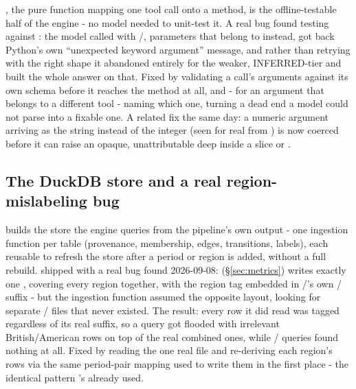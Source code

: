 \documentclass[11pt]{article}
\begin{document}
, the pure function mapping one tool call onto a
 method, is the offline-testable half of the engine - no
model needed to unit-test it. A real bug found testing
 against : the model called
 with /,
parameters that belong to  instead, got
back Python's own ``unexpected keyword argument'' message, and rather
than retrying with the right shape it abandoned
 entirely for the weaker, INFERRED-tier
 and built the whole answer on that. Fixed by
validating a call's arguments against its own schema before it reaches
the method at all, and - for an argument that belongs to a different
tool - naming which one, turning a dead end a model could not parse
into a fixable one. A related fix the same day: a numeric argument
arriving as the string  instead of the integer 
(seen for real from ) is now coerced before it can
raise an opaque, unattributable  deep inside a
slice or .

\subsection{The DuckDB store and a real region-mislabeling bug}

 builds the store the engine queries from
the pipeline's own output - one ingestion function per table
(provenance, membership, edges, transitions, labels), each reusable to
refresh the store after a period or region is added, without a full
rebuild.  shipped with a real bug found
2026-09-08:  (\S\ref{sec:metrics}) writes exactly one
, covering every region together, with the
region tag embedded in /'s own
/ suffix - but the ingestion function
assumed the opposite layout, looking for separate
/ files
that never existed. The result: every row it did read was tagged
 regardless of its real suffix, so a
 query got flooded with irrelevant
British/American rows on top of the real combined ones, while
/ queries found nothing at
all. Fixed by reading the one real file and re-deriving each region's
rows via the same period-pair mapping  used to write
them in the first place - the identical pattern
's  already used.
\end{document}
